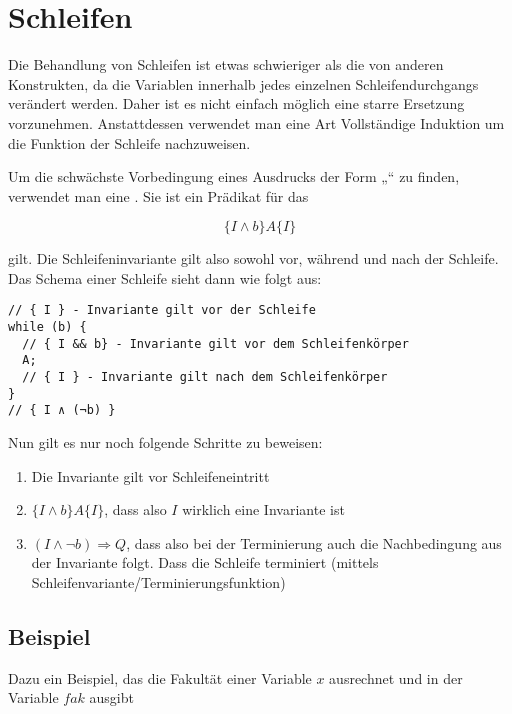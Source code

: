 \documentclass{bschlangaul-theorie}
\begin{document}
\section{Schleifen}

Die Behandlung von Schleifen ist etwas schwieriger als die von anderen
Konstrukten, da die Variablen innerhalb jedes einzelnen
Schleifendurchgangs verändert werden. Daher ist es nicht einfach möglich
eine starre Ersetzung vorzunehmen. Anstattdessen verwendet man eine Art
Vollständige Induktion um die Funktion der Schleife nachzuweisen.

Um die schwächste Vorbedingung eines Ausdrucks der Form
„“ zu finden, verwendet man eine
. Sie ist ein Prädikat für das

\begin{displaymath}
\{ I \wedge b \} A \{ I \}
\end{displaymath}

\noindent
gilt. Die Schleifeninvariante gilt also sowohl vor, während und nach der
Schleife. Das Schema einer Schleife sieht dann wie folgt aus:

\begin{verbatim}
// { I } - Invariante gilt vor der Schleife
while (b) {
  // { I && b} - Invariante gilt vor dem Schleifenkörper
  A;
  // { I } - Invariante gilt nach dem Schleifenkörper
}
// { I ∧ (¬b) }
\end{verbatim}

\noindent
Nun gilt es nur noch folgende Schritte zu beweisen:

\begin{enumerate}
\item Die Invariante gilt vor Schleifeneintritt

\item $\{ I \wedge b \} A \{ I \}$, dass also $I$ wirklich eine
Invariante ist

\item $(I \wedge \neg b) \Rightarrow Q$, dass also bei der Terminierung
auch die Nachbedingung aus der Invariante folgt. Dass die Schleife
terminiert (mittels Schleifenvariante/Terminierungsfunktion)
\end{enumerate}

\subsection{Beispiel}

Dazu ein Beispiel, das die Fakultät einer Variable $x$ ausrechnet und in
der Variable $fak$ ausgibt
\end{document}
